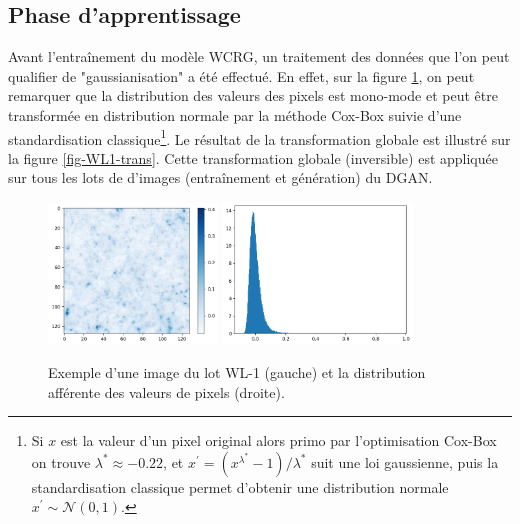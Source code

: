 \documentclass[12pt,twoside]{article}
\begin{document}
\subsection{Phase d'apprentissage}
\label{sec-wcrg-WL1-learning}
%
Avant l'entraînement du modèle WCRG, un traitement des données que l'on peut qualifier de "gaussianisation" a été effectué. En effet, sur la figure \ref{fig-WL1-non-trans}, on peut remarquer que la distribution des valeurs des pixels est mono-mode et peut être transformée en distribution normale par la méthode Cox-Box suivie d'une standardisation classique\footnote{Si $x$ est la valeur d'un pixel original alors primo par l'optimisation Cox-Box on trouve $\lambda^\ast \approx -0.22$, et $x^\prime = (x^{\lambda^\ast}-1)/\lambda^\ast$ suit une loi gaussienne, puis la standardisation classique permet d'obtenir une distribution normale $x^\prime \sim \mathcal{N}(0,1)$.}. Le résultat de la transformation globale est illustré sur la figure \ref{fig-WL1-trans}. Cette transformation globale (inversible) est appliquée sur tous les lots de d'images (entraînement et génération) du DGAN.
%
\begin{figure}[h]
\centering
\includegraphics[width=0.4\textwidth]{fig-WL1-img-non-transformed.png}
\includegraphics[width=0.45\textwidth]{fig-WL1-pixelval-non-trans.png}
\caption{Exemple d'une image du lot WL-1 (gauche) et la distribution afférente des valeurs de pixels (droite).}
\label{fig-WL1-non-trans}
\end{figure}
\end{document}

